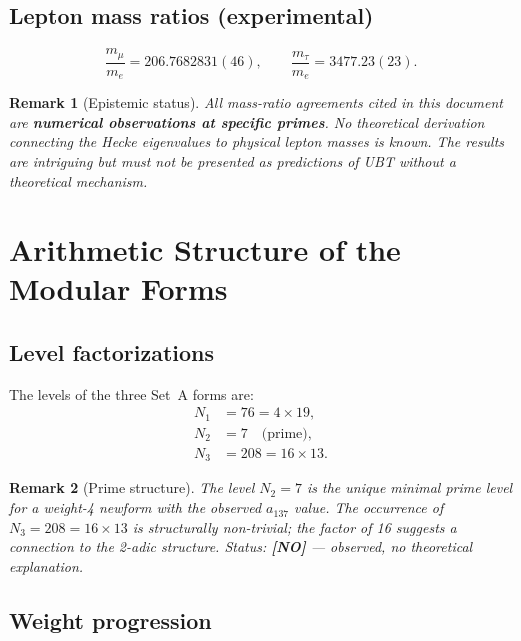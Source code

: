 \documentclass[11pt,a4paper]{article}
\newtheorem{remark}{Remark}
\begin{document}
\subsection{Lepton mass ratios (experimental)}

\begin{equation}
  \frac{m_\mu}{m_e} = 206.7682831(46), \qquad
  \frac{m_\tau}{m_e} = 3477.23(23).
\end{equation}

\begin{remark}[Epistemic status]
  All mass-ratio agreements cited in this document are \textbf{numerical
  observations at specific primes}.  No theoretical derivation connecting
  the Hecke eigenvalues to physical lepton masses is known.  The results
  are intriguing but must not be presented as predictions of UBT without
  a theoretical mechanism.
\end{remark}

\section{Arithmetic Structure of the Modular Forms}
\label{sec:arith}

\subsection{Level factorizations}

The levels of the three Set~A forms are:
\begin{align}
  N_1 &= 76 = 4 \times 19, \\
  N_2 &= 7 \quad \text{(prime)}, \\
  N_3 &= 208 = 16 \times 13.
\end{align}

\begin{remark}[Prime structure]
  The level $N_2 = 7$ is the unique minimal prime level for a weight-4 newform
  with the observed $a_{137}$ value.  The occurrence of $N_3 = 208 = 16 \times 13$
  is structurally non-trivial; the factor of 16 suggests a connection to the
  2-adic structure.  Status: \textbf{[NO]} — observed, no theoretical explanation.
\end{remark}

\subsection{Weight progression}
\end{document}
